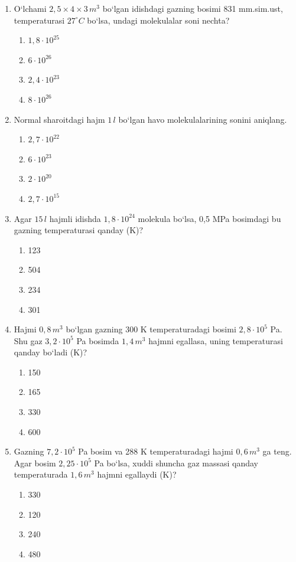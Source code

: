 \begin{enumerate}
\item O‘lchami $2,5 \times 4 \times 3 \, m^3$ bo‘lgan idishdagi gazning bosimi 831 mm.sim.ust, temperaturasi $27^\circ C$ bo‘lsa, undagi molekulalar soni nechta?
\begin{enumerate}[label=\Alph*)]
\item $1,8 \cdot 10^{25}$
\item $6 \cdot 10^{26}$
\item $2,4 \cdot 10^{23}$
\item $8 \cdot 10^{26}$
\end{enumerate}

\item Normal sharoitdagi hajm $1 \, l$ bo‘lgan havo molekulalarining sonini aniqlang.
\begin{enumerate}[label=\Alph*)]
\item $2,7 \cdot 10^{22}$
\item $6 \cdot 10^{23}$
\item $2 \cdot 10^{20}$
\item $2,7 \cdot 10^{15}$
\end{enumerate}

\item Agar $15 \, l$ hajmli idishda $1,8 \cdot 10^{24}$ molekula bo‘lsa, 0,5 MPa bosimdagi bu gazning temperaturasi qanday (K)?
\begin{enumerate}[label=\Alph*)]
\item 123
\item 504
\item 234
\item 301
\end{enumerate}

\item Hajmi $0,8 \, m^3$ bo‘lgan gazning 300 K temperaturadagi bosimi $2,8 \cdot 10^5$ Pa. Shu gaz $3,2 \cdot 10^5$ Pa bosimda $1,4 \, m^3$ hajmni egallasa, uning temperaturasi qanday bo‘ladi (K)?
\begin{enumerate}[label=\Alph*)]
\item 150
\item 165
\item 330
\item 600
\end{enumerate}

\item Gazning $7,2 \cdot 10^5$ Pa bosim va 288 K temperaturadagi hajmi $0,6 \, m^3$ ga teng. Agar bosim $2,25 \cdot 10^5$ Pa bo‘lsa, xuddi shuncha gaz massasi qanday temperaturada $1,6 \, m^3$ hajmni egallaydi (K)?
\begin{enumerate}[label=\Alph*)]
\item 330
\item 120
\item 240
\item 480
\end{enumerate}


\end{enumerate}
